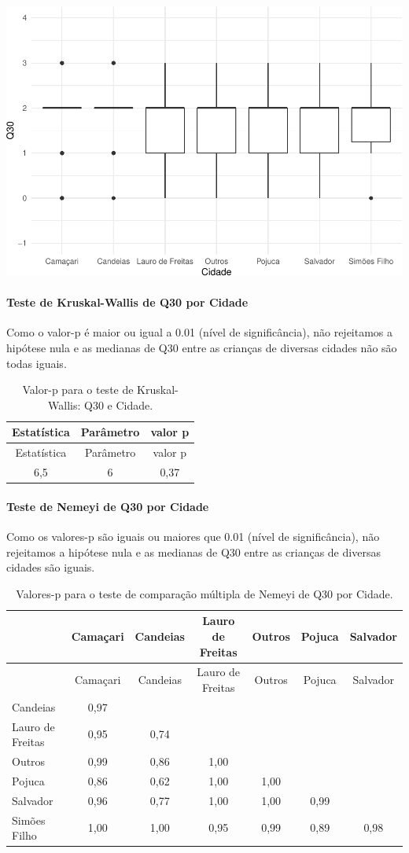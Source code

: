 \documentclass[]{article}
\let\oldparagraph\paragraph
\renewcommand{\paragraph}[1]{\oldparagraph{#1}\mbox{}}
\begin{document}
\begin{center}\includegraphics[width=0.75\linewidth]{relatorio_covid19_files/figure-latex/unnamed-chunk-961-1} \end{center}

\hypertarget{teste-de-kruskal-wallis-de-q30-por-cidade}{%
\paragraph{Teste de Kruskal-Wallis de Q30 por Cidade}\label{teste-de-kruskal-wallis-de-q30-por-cidade}}

Como o valor-p é maior ou igual a 0.01 (nível de significância), não rejeitamos a hipótese nula e as medianas de Q30 entre as crianças de diversas cidades não são todas iguais.

\begin{longtable}[]{@{}ccc@{}}
\caption{\label{tab:unnamed-chunk-963}Valor-p para o teste de Kruskal-Wallis: Q30 e Cidade.}\tabularnewline
\toprule
Estatística & Parâmetro & valor p\tabularnewline
\midrule
\endfirsthead
\toprule
Estatística & Parâmetro & valor p\tabularnewline
\midrule
\endhead
6,5 & 6 & 0,37\tabularnewline
\bottomrule
\end{longtable}

\hypertarget{teste-de-nemeyi-de-q30-por-cidade}{%
\paragraph{Teste de Nemeyi de Q30 por Cidade}\label{teste-de-nemeyi-de-q30-por-cidade}}

Como os valores-p são iguais ou maiores que 0.01 (nível de significância), não rejeitamos a hipótese nula e as medianas de Q30 entre as crianças de diversas cidades são iguais.

\begin{longtable}[]{@{}lcccccc@{}}
\caption{\label{tab:unnamed-chunk-965}Valores-p para o teste de comparação múltipla de Nemeyi de Q30 por Cidade.}\tabularnewline
\toprule
& Camaçari & Candeias & Lauro de Freitas & Outros & Pojuca & Salvador\tabularnewline
\midrule
\endfirsthead
\toprule
& Camaçari & Candeias & Lauro de Freitas & Outros & Pojuca & Salvador\tabularnewline
\midrule
\endhead
Candeias & 0,97 & & & & &\tabularnewline
Lauro de Freitas & 0,95 & 0,74 & & & &\tabularnewline
Outros & 0,99 & 0,86 & 1,00 & & &\tabularnewline
Pojuca & 0,86 & 0,62 & 1,00 & 1,00 & &\tabularnewline
Salvador & 0,96 & 0,77 & 1,00 & 1,00 & 0,99 &\tabularnewline
Simões Filho & 1,00 & 1,00 & 0,95 & 0,99 & 0,89 & 0,98\tabularnewline
\bottomrule
\end{longtable}
\end{document}
